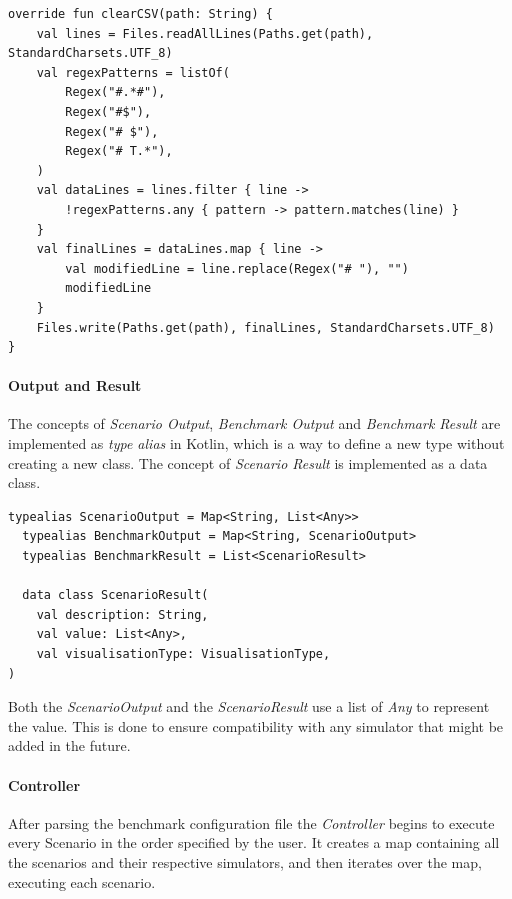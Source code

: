 \documentclass[12pt,a4paper,openright,twoside]{book}
\begin{document}
\begin{lstlisting}[style=my-kotlin, language=my-kotlin, caption={CSV file cleaning in Alchemist}]
override fun clearCSV(path: String) {
    val lines = Files.readAllLines(Paths.get(path), StandardCharsets.UTF_8)
    val regexPatterns = listOf(
        Regex("#.*#"),
        Regex("#$"),
        Regex("# $"),
        Regex("# T.*"),
    )
    val dataLines = lines.filter { line ->
        !regexPatterns.any { pattern -> pattern.matches(line) }
    }
    val finalLines = dataLines.map { line ->
        val modifiedLine = line.replace(Regex("# "), "")
        modifiedLine
    }
    Files.write(Paths.get(path), finalLines, StandardCharsets.UTF_8)
}
\end{lstlisting}

\paragraph*{Output and Result}

The concepts of \emph{Scenario Output}, \emph{Benchmark Output} and \emph{Benchmark Result} are implemented as \emph{type alias} in Kotlin, which is a way to define a new type without creating a new class.
The concept of \emph{Scenario Result} is implemented as a data class.

\begin{lstlisting}[style=my-kotlin, language=my-kotlin, caption={Benchmark output and result model}]
  typealias ScenarioOutput = Map<String, List<Any>>
  typealias BenchmarkOutput = Map<String, ScenarioOutput>
  typealias BenchmarkResult = List<ScenarioResult>

  data class ScenarioResult(
    val description: String,
    val value: List<Any>,
    val visualisationType: VisualisationType,
)
\end{lstlisting}

Both the \textit{ScenarioOutput} and the \textit{ScenarioResult} use a list of \emph{Any} to represent the value.
This is done to ensure compatibility with any simulator that might be added in the future.

\paragraph*{Controller}

After parsing the benchmark configuration file the \emph{Controller} begins to execute every Scenario in the order specified by the user.
It creates a map containing all the scenarios and their respective simulators, and then iterates over the map, executing each scenario.
\end{document}
